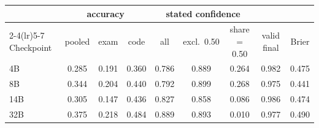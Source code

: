 \begin{tabular}{lcccccccc}
\toprule
& \multicolumn{3}{c}{accuracy} & \multicolumn{3}{c}{stated confidence} & & \\
\cmidrule(lr){2-4}\cmidrule(lr){5-7}
Checkpoint & pooled & exam & code & all & excl.\ 0.50 & share $=$0.50 & valid final & Brier \\
\midrule
4B & 0.285 & 0.191 & 0.360 & 0.786 & 0.889 & 0.264 & 0.982 & 0.475 \\
8B & 0.344 & 0.204 & 0.440 & 0.792 & 0.899 & 0.268 & 0.975 & 0.441 \\
14B & 0.305 & 0.147 & 0.436 & 0.827 & 0.858 & 0.086 & 0.986 & 0.474 \\
32B & 0.375 & 0.218 & 0.484 & 0.889 & 0.893 & 0.010 & 0.977 & 0.490 \\
\bottomrule
\end{tabular}
